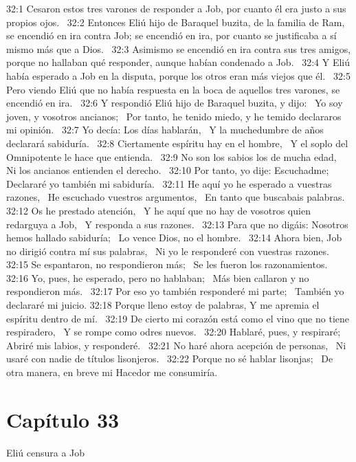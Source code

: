 32:1 Cesaron estos tres varones de responder a Job, por cuanto él era justo a sus propios ojos.  
32:2 Entonces Eliú hijo de Baraquel buzita, de la familia de Ram, se encendió en ira contra Job; se encendió en ira, por cuanto se justificaba a sí mismo más que a Dios.  
32:3 Asimismo se encendió en ira contra sus tres amigos, porque no hallaban qué responder, aunque habían condenado a Job.  
32:4 Y Eliú había esperado a Job en la disputa, porque los otros eran más viejos que él.  
32:5 Pero viendo Eliú que no había respuesta en la boca de aquellos tres varones, se encendió en ira.  
32:6 Y respondió Eliú hijo de Baraquel buzita, y dijo:  
Yo soy joven, y vosotros ancianos;  
Por tanto, he tenido miedo, y he temido declararos mi opinión.  
32:7 Yo decía: Los días hablarán,  
Y la muchedumbre de años declarará sabiduría.  
32:8 Ciertamente espíritu hay en el hombre,  
Y el soplo del Omnipotente le hace que entienda.  
32:9 No son los sabios los de mucha edad,  
Ni los ancianos entienden el derecho.  
32:10 Por tanto, yo dije: Escuchadme;  
Declararé yo también mi sabiduría.  
32:11 He aquí yo he esperado a vuestras razones,  
He escuchado vuestros argumentos,  
En tanto que buscabais palabras.  
32:12 Os he prestado atención,  
Y he aquí que no hay de vosotros quien redarguya a Job,  
Y responda a sus razones.  
32:13 Para que no digáis: Nosotros hemos hallado sabiduría;  
Lo vence Dios, no el hombre.  
32:14 Ahora bien, Job no dirigió contra mí sus palabras,  
Ni yo le responderé con vuestras razones.  
32:15 Se espantaron, no respondieron más;  
Se les fueron los razonamientos.  
32:16 Yo, pues, he esperado, pero no hablaban;  
Más bien callaron y no respondieron más.  
32:17 Por eso yo también responderé mi parte;  
También yo declararé mi juicio. 
32:18 Porque lleno estoy de palabras, 
Y me apremia el espíritu dentro de mí.  
32:19 De cierto mi corazón está como el vino que no tiene respiradero,  
Y se rompe como odres nuevos.  
32:20 Hablaré, pues, y respiraré;  
Abriré mis labios, y responderé.  
32:21 No haré ahora acepción de personas,  
Ni usaré con nadie de títulos lisonjeros.  
32:22 Porque no sé hablar lisonjas;  
De otra manera, en breve mi Hacedor me consumiría.  
\section*{Capítulo 33 }
Eliú censura a Job  

